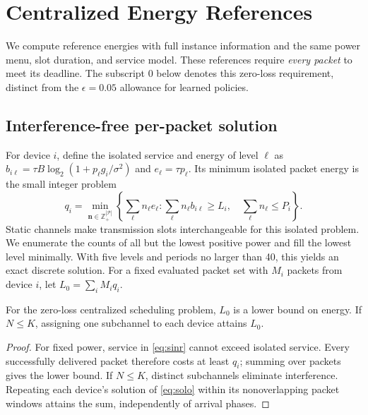 \section{Centralized Energy References}\label{sec:bounds}
We compute reference energies with full instance information and the same
power menu, slot duration, and service model. These references require
\emph{every packet} to meet its deadline. The subscript $0$ below denotes this
zero-loss requirement, distinct from the $\epsilon=0.05$ allowance for learned
policies.

\subsection{Interference-free per-packet solution}
For device $i$, define the isolated service and energy of level $\ell$ as
$b_{i\ell}=\tau B\log_2(1+p_\ell g_i/\sigma^2)$ and
$e_\ell=\tau p_\ell$. Its minimum isolated packet energy is the small integer
problem
\begin{equation}
q_i=\min_{\boldsymbol n\in\mathbb Z_+^{|\mathcal P|}}
 \left\{\sum_\ell n_\ell e_\ell:
 \sum_\ell n_\ell b_{i\ell}\ge L_i,\quad
 \sum_\ell n_\ell\le P_i\right\}.\label{eq:solo}
\end{equation}
Static channels make transmission slots interchangeable for this isolated
problem. We enumerate the counts of all but the lowest positive power and fill
the lowest level minimally. With five levels and periods no larger than 40,
this yields an exact discrete solution. For a fixed evaluated packet set with
$M_i$ packets from device $i$, let $L_0=\sum_i M_iq_i$.

\begin{proposition}\label{prop:bound}
For the zero-loss centralized scheduling problem, $L_0$ is a lower bound on
energy. If $N\le K$, assigning one subchannel to each device attains $L_0$.
\end{proposition}
\begin{proof}
For fixed power, service in \eqref{eq:sinr} cannot exceed isolated service.
Every successfully delivered packet therefore costs at least $q_i$; summing
over packets gives the lower bound. If $N\le K$, distinct subchannels eliminate
interference. Repeating each device's solution of \eqref{eq:solo} within its
nonoverlapping packet windows attains the sum, independently of arrival phases.
\end{proof}

